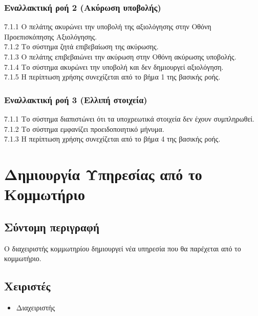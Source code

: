 \documentclass[12pt,a4paper,twoside]{book}
\begin{document}
\subsubsection*{Εναλλακτική ροή 2 (Ακύρωση υποβολής)}
7.1.1 Ο πελάτης ακυρώνει την υποβολή της αξιολόγησης στην Οθόνη Προεπισκόπησης Αξιολόγησης.\\
\hspace*{\parindent}7.1.2 Το σύστημα ζητά επιβεβαίωση της ακύρωσης.\\
\hspace*{\parindent}7.1.3 Ο πελάτης επιβεβαιώνει την ακύρωση στην Οθόνη ακύρωσης υποβολής.\\
\hspace*{\parindent}7.1.4 Το σύστημα ακυρώνει την υποβολή και δεν δημιουργεί αξιολόγηση.\\
\hspace*{\parindent}7.1.5 Η περίπτωση χρήσης συνεχίζεται από το βήμα 1 της βασικής ροής.

\subsubsection*{Εναλλακτική ροή 3 (Ελλιπή στοιχεία)}
7.1.1 Το σύστημα διαπιστώνει ότι τα υποχρεωτικά στοιχεία δεν έχουν συμπληρωθεί.\\
\hspace*{\parindent}7.1.2 Το σύστημα εμφανίζει προειδοποιητικό μήνυμα.\\
\hspace*{\parindent}7.1.3 Η περίπτωση χρήσης συνεχίζεται από το βήμα 4 της βασικής ροής.

\section{Δημιουργία Υπηρεσίας από το Κομμωτήριο}

\subsection{Σύντομη περιγραφή}
Ο διαχειριστής κομμωτηρίου δημιουργεί νέα υπηρεσία που θα παρέχεται από το κομμωτήριο.

\subsection{Χειριστές}
\begin{itemize}
    \item Διαχειριστής
\end{itemize}
\end{document}
